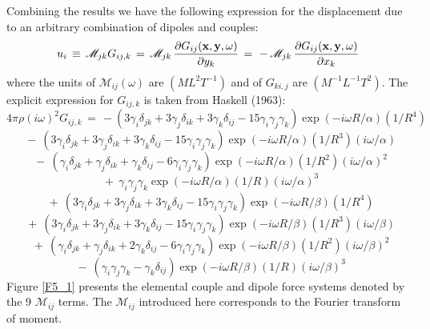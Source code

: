 \documentclass{article}
\begin{document}
Combining the results we have the following expression for the
displacement due to an arbitrary combination of dipoles and couples:
$$
u_i 
\,\equiv\, {\mathscr{M}}_{jk}   G_{ij,k} 
\,=\,  {\mathscr{M}}_{jk} \, \frac{ \partial G_{ij} ( {\bf x} , {\bf y} , \omega )   }{  \partial y_k } 
\,=\,  \,-\, {\mathscr{M}}_{jk} \, \frac{ \partial G_{ij} ( {\bf x} , {\bf y} , \omega )   }{  \partial x_k } 
$$
where the units of $ {\mathscr{M}}_{ij} ( \omega )  $ are $(M L^2 T^{-1} )$ and of $ G_{ki,j} $ are $(M^{-1} L^{-1} T^2 )$. 
The explicit expression for $ G_{ij,k}$ is taken from Haskell (1963):
$$
4 \pi \rho ( i \omega )^2 G_{ij,k}  \,=\, 
- ( 3 \gamma_i \delta_{jk} + 3 \gamma_j \delta_{ik} + 3 \gamma_k \delta_{ij} - 15 \gamma_i \gamma_j \gamma_k ) 
\exp ( - i \omega R / \alpha ) (1 / R^4 )
$$
$$
 \ \ -\  ( 3 \gamma_i \delta_{jk} + 3 \gamma_j \delta_{ik} + 3 \gamma_k \delta_{ij} - 15 \gamma_i \gamma_j \gamma_k )
\exp ( - i \omega R / \alpha ) (1 / R^3 ) ( i \omega / \alpha )
$$
$$
 \ \ -\   ( \gamma_i \delta_{jk} + \gamma_j \delta_{ik} + \gamma_k \delta_{ij} - 6 \gamma_i \gamma_j \gamma_k  )
\exp ( - i \omega R / \alpha ) (1 / R^2 ) ( i \omega / \alpha )^2
$$
$$
 \ \ +\  \gamma_i \gamma_j \gamma_k 
\exp ( - i \omega R / \alpha ) (1 / R  ) ( i \omega / \alpha )^3
$$
$$
 \ \ +\ 
 ( 3 \gamma_i \delta_{jk} + 3 \gamma_j \delta_{ik} + 3 \gamma_k \delta_{ij} - 15 \gamma_i \gamma_j \gamma_k ) 
\exp ( - i \omega R / \beta ) (1 / R^4 )
$$
$$
 \ \ +\   ( 3 \gamma_i \delta_{jk} + 3 \gamma_j \delta_{ik} + 3 \gamma_k \delta_{ij} - 15 \gamma_i \gamma_j \gamma_k )
\exp ( - i \omega R / \beta ) (1 / R^3 ) ( i \omega / \beta )
$$
$$
 \ \ +\   ( \gamma_i \delta_{jk} + \gamma_j \delta_{ik} + 2 \gamma_k \delta_{ij} - 6 \gamma_i \gamma_j \gamma_k  )
\exp ( - i \omega R / \beta ) (1 / R^2 ) ( i \omega / \beta )^2
$$
$$
 \ \ -\  ( \gamma_i \gamma_j \gamma_k - \gamma_k \delta_{ij} )
\exp ( - i \omega R / \beta ) (1 / R  ) ( i \omega / \beta )^3
$$
Figure \ref{F5_1} presents the elemental couple and dipole force
systems denoted by the 9 $ {\mathscr{M}}_{ij} $ terms. 
The $ {\mathscr{M}}_{ij} $ introduced here corresponds to the Fourier transform of moment.
\end{document}
